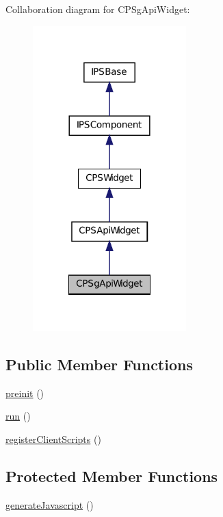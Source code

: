 Collaboration diagram for CPSgApiWidget:\nopagebreak
\begin{figure}[H]
\begin{center}
\leavevmode
\includegraphics[width=168pt]{classCPSgApiWidget__coll__graph}
\end{center}
\end{figure}
\subsection*{Public Member Functions}
\begin{DoxyCompactItemize}
\item 
\hyperlink{classCPSgApiWidget_a2dc262e99b1c246b56f27626bfe699ff}{preinit} ()
\item 
\hyperlink{classCPSgApiWidget_afb0fafe7e02a3ae1993c01c19fad2bae}{run} ()
\item 
\hyperlink{classCPSgApiWidget_a59080ee7d7949e19f5af41e26ff53806}{registerClientScripts} ()
\end{DoxyCompactItemize}
\subsection*{Protected Member Functions}
\begin{DoxyCompactItemize}
\item 
\hyperlink{classCPSgApiWidget_a2a2ea08f8240ed4c24058ab80ab89703}{generateJavascript} ()
\end{DoxyCompactItemize}


